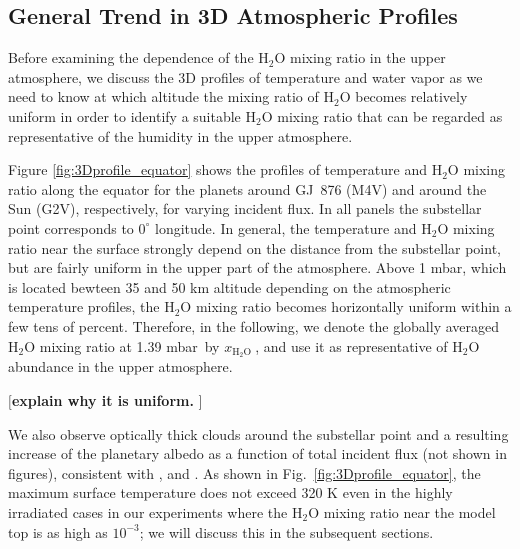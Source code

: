 \documentclass[11pt,numberedappendix,twocolappendix,]{emulateapj}
\def\water{H$_2$O }
\def\xwater{\dsa{$x_\text{\water}$}}
\def\preslevel{1.39 mbar\ }
\def\memo#1{\color{red}$[${\bf #1}$]$ \color{black}}
\newcommand{\dsa}[1]{{\color{blue}#1}}
\begin{document}
\subsection{General Trend in 3D Atmospheric Profiles}
\label{ss:result_H2Omixingratio}


Before examining the dependence of the \water mixing ratio in the upper atmosphere, we discuss the \dsa{3D} profiles of temperature and water vapor \dsa{as} we need to know at which altitude the mixing ratio \dsa{of \water} becomes relatively uniform \dsa{in order} to identify \dsa{a suitable} \water mixing ratio \dsa{that} can be regarded as representative of the humidity in the upper atmosphere. 

Figure \ref{fig:3Dprofile_equator} \dsa{shows} the profiles of temperature and \water mixing ratio along the equator for \dsa{the} planets around GJ~876 (M4V) and around the Sun (G2V), respectively, \dsa{for} varying incident flux. 
In all panels the substellar point corresponds to \dsa{$0^{\circ }$ longitude}. 
In general, \dsa{the} temperature and \water mixing ratio \dsa{near the surface} strongly depend on the distance from the substellar point, but are fairly uniform in the upper part of the atmosphere. 
Above 1 mbar, which is \dsa{located bewteen 35 and 50 km} altitude depending on the atmospheric temperature profiles, \dsa{the} \water mixing ratio becomes horizontally uniform within a few tens of percent. 
Therefore, in the following, we denote \dsa{the} globally averaged \water mixing ratio at \preslevel by \xwater, and use it as representative of \water abundance in the upper atmosphere. 

\memo{explain why it is uniform. }

We also observe optically thick clouds around the \dsa{substellar} point and \dsa{a resulting} increase of \dsa{the} planetary albedo as a function of total incident flux (not shown in figures), consistent with \citet{Yang2013,Yang2014}, \citet{Kopparapu2016} and \citet{Way2016}. 
As shown in Fig.~\ref{fig:3Dprofile_equator}, the maximum surface temperature does not exceed 320 K even in \dsa{the} highly irradiated cases in our experiments where \dsa{the} \water mixing ratio near the model top is as high as $10^{-3}$; we will discuss this in the subsequent sections. 


\end{document}
